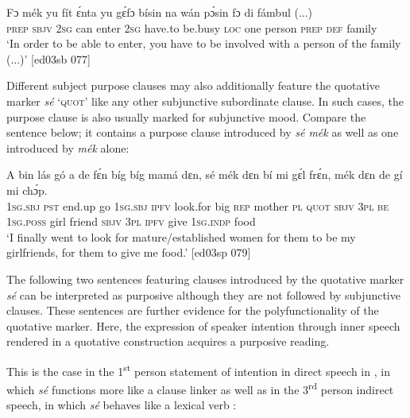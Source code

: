 \ea%
    \label{ex:key:1499}
    \gll Fɔ  mék    yu  fít  ɛ́nta    yu  gɛ́fɔ    bísin  na  wán  pɔ́sin
fɔ  di  fámbul  (...)\\
\textsc{prep}  \textsc{sbjv}    \textsc{2sg}  can  enter  \textsc{2sg}  have.to  be.busy  \textsc{loc}  one  person
\textsc{prep}  \textsc{def}  family\\

\glt ‘In order to be able to enter, you have to be involved with a person 
of the family (...)’ [ed03sb 077]
\z

Different subject purpose clauses may also additionally feature the quotative marker \textit{sé} ‘\textsc{quot}’ like any other subjunctive subordinate clause. In such cases, the purpose clause is also usually marked for subjunctive mood. Compare the sentence below; it contains a purpose clause introduced by \textit{sé mék} as well as one introduced by \textit{mék} alone: 


\ea%
    \label{ex:key:1500}
    \gll A    bin  lás    gó  a    de  fɛ́n    bíg  bíg  mamá  dɛn, sé    mék  
dɛn  bí  mi    gɛ́l  frɛ́n,  mék    dɛn  de  gí  mi    chɔ́p.\\
\textsc{1sg.sbj}  \textsc{pst}  end.up  go  \textsc{1sg.sbj}  \textsc{ipfv}  look.for  big  \textsc{rep}  mother  \textsc{pl}  \textsc{quot}    \textsc{sbjv}
\textsc{3pl}  \textsc{be}  \textsc{1sg.poss}  girl  friend   \textsc{sbjv}    \textsc{3pl}  \textsc{ipfv}  give  \textsc{1sg.indp}  food\\
\glt ‘I finally went to look for mature/established women for them to be my girlfriends, 
for them to give me food.’ [ed03sp 079]
\z

The following two sentences featuring clauses introduced by the quotative marker \textit{sé} can be interpreted as purposive although they are not followed by subjunctive clauses. These sentences are further evidence for the polyfunctionality of the quotative marker. Here, the expression of speaker intention through inner speech rendered in a quotative construction acquires a purposive reading. 


This is the case in the 1\textsuperscript{st} person statement of intention in direct speech in , in which \textit{sé} functions more like a clause linker as well as in the 3\textsuperscript{rd} person indirect speech, in which \textit{sé} behaves like a lexical verb :



